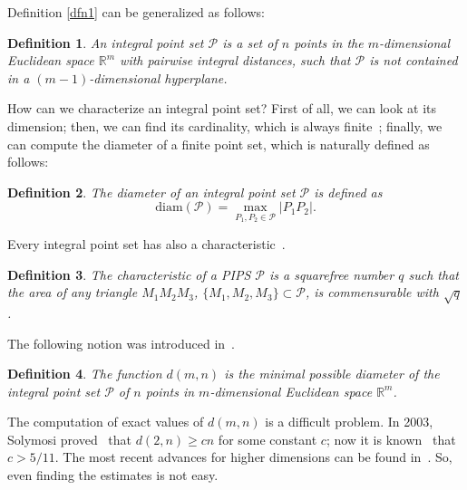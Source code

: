 \documentclass[12pt]{article}
\theoremstyle{theorem}
\theoremstyle{dfn}
\newtheorem{dfn}{Definition}
\theoremstyle{remark}
\begin{document}
Definition \ref{dfn1} can be generalized as follows:

\begin{dfn}
	An integral point set $\mathcal{P}$ is a set of $n$ points in
	the $m$-dimensional Euclidean space $\mathbb{R}^{m}$ with pairwise
	integral distances,
	such that $\mathcal{P}$ is not contained in a $(m-1)$-dimensional hyperplane.
\end{dfn}

How can we characterize an integral point set?
First of all, we can look at its dimension;
then, we can find its cardinality, which is always finite~\cite{anning1945integral,erdos1945integral};
finally, we can compute the diameter of a finite point set,
which is naturally defined as follows:

\begin{dfn}
	The diameter of an integral point set $\mathcal{P}$ is defined as
	\begin{equation}
		\operatorname{diam(\mathcal{P})} = \underset{P_{1}, P_{2} \in
		\mathcal{P}}{\max} |P_{1}P_{2}|
		.
	\end{equation}
\end{dfn}

Every integral point set has also a characteristic~\cite{kemnitz1988punktmengen,kurz2005characteristic}.

\begin{dfn}
	The characteristic of a PIPS $\mathcal{P}$ is a squarefree number $q$
	such that the area of any triangle $M_1M_2M_3$, $\{M_1,M_2,M_3\}\subset \mathcal{P}$,
	is commensurable with $\sqrt{q}$.
\end{dfn}

The following notion was introduced in~\cite{kurz2008bounds}.

\begin{dfn}
	The function $d(m, n)$ is the minimal possible diameter of
	the integral point set $\mathcal{P}$ of $n$ points in
	$m$-dimensional Euclidean space $\mathbb{R}^{m}$.
\end{dfn}

The computation of exact values of $d(m,n)$ is a difficult problem.
In 2003, Solymosi proved~\cite{solymosi2003note} that $d(2,n) \geq cn$ for some constant $c$;
now it is known~\cite{my-pps-linear-bound-2019} that $c>5/11$.
The most recent advances for higher dimensions can be found in~\cite{nozaki2013lower}.
So, even finding the estimates is not easy.

%
\end{document}
